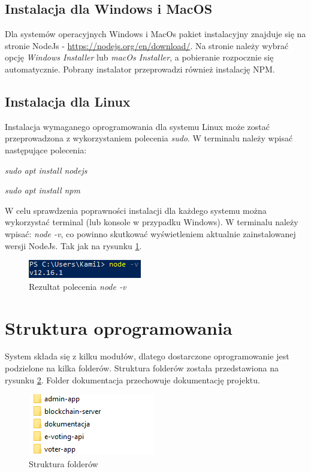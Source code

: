 \documentclass[a4paper,12pt]{book}
\begin{document}
\subsection{Instalacja dla Windows i MacOS}
Dla systemów operacyjnych Windows i MacOs pakiet instalacyjny znajduje się na stronie NodeJs - \url{https://nodejs.org/en/download/}. Na stronie należy wybrać opcję \textit{Windows Installer} lub \textit{macOs Installer}, a pobieranie rozpocznie się automatycznie. Pobrany instalator przeprowadzi również instalację NPM.

\subsection{Instalacja dla Linux}
Instalacja wymaganego oprogramowania dla systemu Linux może zostać przeprowadzona z wykorzystaniem polecenia \textit{sudo}. W terminalu należy wpisać następujące polecenia: 

\textit{sudo apt install nodejs}

\textit{sudo apt install npm}

W celu sprawdzenia poprawności instalacji dla każdego systemu można wykorzystać terminal (lub konsole w przypadku Windows). W terminalu należy wpisać: \textit{node -v}, co powinno skutkować wyświetleniem aktualnie zainstalowanej wersji NodeJs. Tak jak na rysunku \ref{nodeversion}.

\begin{figure}[h]
	\centering
	\includegraphics[width=\textwidth]{images/node_version.png}
	\caption{Rezultat polecenia \textit{node -v}}\label{nodeversion}
\end {figure}

\section{Struktura oprogramowania}

System składa się z kilku modułów, dlatego dostarczone oprogramowanie jest podzielone na kilka folderów. Struktura folderów została przedstawiona na rysunku \ref{foldery}. Folder dokumentacja przechowuje dokumentację projektu.

\begin{figure}[h]
	\centering
	\includegraphics[width=\textwidth]{images/foldery.png}
	\caption{Struktura folderów}\label{foldery}
\end {figure}
\end{document}
